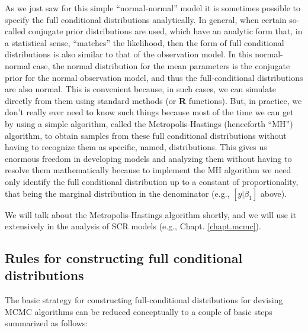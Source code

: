 As we just saw for this simple ``normal-normal'' model it is sometimes
possible to specify the full conditional distributions
analytically. In general, when certain so-called conjugate prior
distributions are used, which have an analytic form that, in a
statistical
sense, ``matches'' the likelihood, then the form of full conditional distributions
is also similar to that of the observation model. In this normal-normal
case, the normal distribution for the mean parameters is the conjugate
prior for the normal observation model, and thus the full-conditional
distributions are also normal. This is convenient because, in such
cases, we can simulate directly from them using standard methods (or
{\bf R}
functions).  But, in practice, we don't really ever need to know such
things because most of the time we can get by using a simple
algorithm, called the Metropolis-Hastings (henceforth ``MH'')
algorithm, to obtain samples from these full conditional distributions
without having to recognize them as specific, named, distributions.
This gives us enormous freedom in developing models
and analyzing them without having to resolve them mathematically
because to implement the MH algorithm we need only identify the full
conditional distribution up to a constant of proportionality, that
being the marginal distribution in the denominator (e.g., $[y|\beta_1]$
above).

We will talk about the Metropolis-Hastings algorithm shortly, and we
will use it extensively in the analysis of SCR models (e.g., Chapt.
\ref{chapt.mcmc}).

\subsection{Rules for constructing full conditional distributions}
\label{glms.sec.rules}

The basic strategy for constructing full-conditional distributions for
devising MCMC algorithms can be reduced conceptually to a couple of
basic steps summarized as follows:

